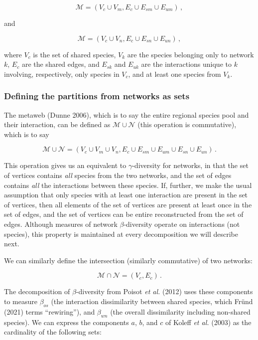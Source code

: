 \documentclass[11pt]{article}
\begin{document}
\[\mathcal{M} = (V_c \cup V_m, E_c \cup E_{sm} \cup E_{um}) \,,\]

and

\[\mathcal{M} = (V_c \cup V_n, E_c \cup E_{sn} \cup E_{un}) \,,\]

where \(V_c\) is the set of shared species, \(V_k\) are the species
belonging only to network \(k\), \(E_c\) are the shared edges, and
\(E_{sk}\) and \(E_{uk}\) are the interactions unique to \(k\)
involving, respectively, only species in \(V_c\), and at least one
species from \(V_k\).

\hypertarget{defining-the-partitions-from-networks-as-sets}{%
\subsubsection{Defining the partitions from networks as
sets}\label{defining-the-partitions-from-networks-as-sets}}

The metaweb (Dunne 2006), which is to say the entire regional species
pool and their interaction, can be defined as
\(\mathcal{M} \cup \mathcal{N}\) (this operation is commutative), which
is to say

\[\mathcal{M} \cup \mathcal{N} = (V_c \cup V_m \cup V_n, E_c \cup E_{sm} \cup E_{um} \cup E_{sn} \cup E_{un}) \,.\]

This operation gives us an equivalent to \(\gamma\)-diversity for
networks, in that the set of vertices contains \emph{all} species from
the two networks, and the set of edges contains \emph{all} the
interactions between these species. If, further, we make the usual
assumption that only species with at least one interaction are present
in the set of vertices, then all elements of the set of vertices are
present at least once in the set of edges, and the set of vertices can
be entire reconstructed from the set of edges. Although measures of
network \(\beta\)-diversity operate on interactions (not species), this
property is maintained at every decomposition we will describe next.

We can similarly define the intersection (similarly commutative) of two
networks:

\[\mathcal{M} \cap \mathcal{N} = (V_c, E_c)\,.\]

The decomposition of \(\beta\)-diversity from Poisot \emph{et al.}
(2012) uses these components to measure \(\beta_{os}\) (the interaction
dissimilarity between shared species, which Fründ (2021) terms
``rewiring''), and \(\beta_{wn}\) (the overall dissimilarity including
non-shared species). We can express the components \(a\), \(b\), and
\(c\) of Koleff \emph{et al.} (2003) as the cardinality of the following
sets:
\end{document}
